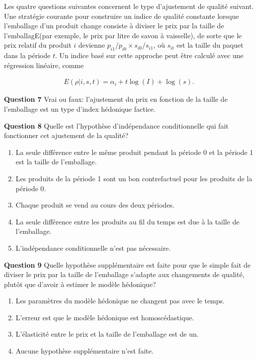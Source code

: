 \documentclass[
]{article}
\begin{document}
Les quatre questions suivantes concernent le type d'ajustement de qualité suivant. Une stratégie courante pour construire un indice de qualité constante lorsque l'emballage d'un produit change consiste à diviser le prix par la taille de l'emballagE(par exemple, le prix par litre de savon à vaisselle), de sorte que le prix relatif du produit \(i\) devienne \(p_{i1} / p_{i0} \times s_{i0} / s_{i1}\), où \(s_{it}\) est la taille du paquet dans la période \(t\). Un indice basé sur cette approche peut être calculé avec une régression linéaire, comme

\begin{align*}
E(\rho | i, s, t) = \alpha_i + t \log(I) + \log(s).
\end{align*}

\textbf{Question 7} Vrai ou faux: l'ajustement du prix en fonction de la taille de l'emballage est un type d'index hédonique factice.

\textbf{Question 8} Quelle est l'hypothèse d'indépendance conditionnelle qui fait fonctionner cet ajustement de la qualité?

\begin{enumerate}
\def\labelenumi{\alph{enumi})}
\item
  La seule différence entre le même produit pendant la période 0 et la période 1 est la taille de l'emballage.
\item
  Les produits de la période 1 sont un bon contrefactuel pour les produits de la période 0.
\item
  Chaque produit se vend au cours des deux périodes.
\item
  La seule différence entre les produits au fil du temps est due à la taille de l'emballage.
\item
  L'indépendance conditionnelle n'est pas nécessaire.
\end{enumerate}

\textbf{Question 9} Quelle hypothèse supplémentaire est faite pour que le simple fait de diviser le prix par la taille de l'emballage s'adapte aux changements de qualité, plutôt que d'avoir à estimer le modèle hédonique?

\begin{enumerate}
\def\labelenumi{\alph{enumi})}
\item
  Les paramètres du modèle hédonique ne changent pas avec le temps.
\item
  L'erreur est que le modèle hédonique est homoscédastique.
\item
  L'élasticité entre le prix et la taille de l'emballage est de un.
\item
  Aucune hypothèse supplémentaire n'est faite.
\end{enumerate}
\end{document}
